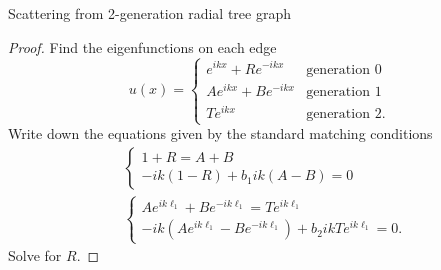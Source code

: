 \documentclass{beamer}
\begin{document}
  \begin{frame}{Scattering from 2-generation radial tree graph}
    \begin{proof}
      Find the eigenfunctions on each edge
      \begin{equation*}
        u(x) = \begin{cases}
             e^{ikx} + Re^{-ikx}   & \text{generation 0} \\
          Ae^{ikx} + Be^{-ikx} & \text{generation 1} \\
          Te^{ikx}                 & \text{generation 2}.
        \end{cases}
      \end{equation*}
      Write down the equations given by the standard matching conditions
      \begin{align*}
        & \begin{cases}
          1+R = A+B \\
          -ik(1-R) + b_1 ik(A-B) = 0
        \end{cases} \\
        & \begin{cases}
          Ae^{ik\ell_1} + Be^{-ik\ell_1} = Te^{ik\ell_1} \\
          -ik(Ae^{ik\ell_1}-Be^{-ik\ell_1}) + b_2 ikTe^{ik\ell_1} = 0.
        \end{cases}
      \end{align*}
      Solve for $R$.
    \end{proof}
  \end{frame}
\end{document}
